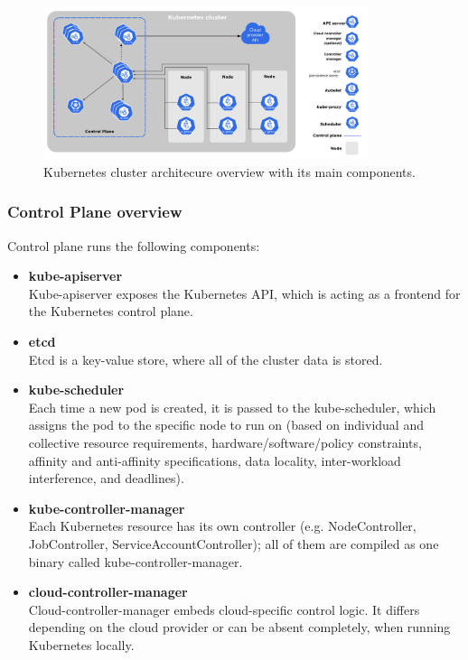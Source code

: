 \begin{figure}[!hbt]
	\begin{center}
		\includegraphics[width=0.85\textwidth]{images/components-of-kubernetes.pdf}
        \caption{Kubernetes cluster architecure overview with its main components.}
		\label{img:kubernetes-architecture}
	\end{center}
\end{figure}

\subsubsection*{Control Plane overview}

Control plane runs the following components: 
\begin{itemize}
\item \textbf{kube-apiserver} \\
Kube-apiserver exposes the Kubernetes API, which is acting as a frontend for the Kubernetes control plane.
\item \textbf{etcd} \\
Etcd is a key-value store, where all of the cluster data is stored.
\item \textbf{kube-scheduler} \\
Each time a new pod is created, it is passed to the kube-scheduler, which assigns the pod to the specific node to run on (based on individual and collective resource requirements, hardware/software/policy constraints, affinity and anti-affinity specifications, data locality, inter-workload interference, and deadlines).
\item \textbf{kube-controller-manager} \\
Each Kubernetes resource has its own controller (e.g. NodeController, JobController, ServiceAccountController); all of them are compiled as one binary called kube-controller-manager.
\item \textbf{cloud-controller-manager} \\
Cloud-controller-manager embeds cloud-specific control logic. It differs depending on the cloud provider or can be absent completely, when running Kubernetes locally.
\end{itemize}

